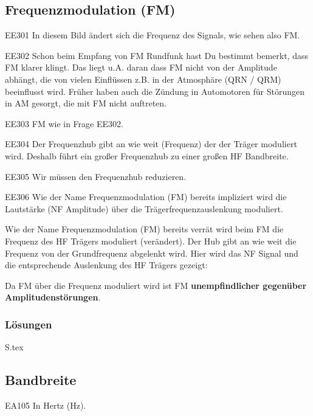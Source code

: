\documentclass[10pt,a4paper,ngerman]{article}
\theoremstyle{definition}
\theoremstyle{plain}
\theoremstyle{mytheorem}
\theoremstyle{definition}
\newcommand{\pic}[2][1]{%
\begin{center}
    \begin{tikzpicture}[scale=#1]
                
    \end{tikzpicture}
\end{center}    
}
\newenvironment{ohmchapter}{}
{
  \subsubsection*{Lösungen}
  S\arabic{subsection}.tex}
}
\begin{document}
\subsection{Frequenzmodulation (FM)}
\begin{sol}{EE301}
  In diesem Bild ändert sich die Frequenz des Signals, wie sehen also FM.
\end{sol}

\begin{sol}{EE302}
  Schon beim Empfang von FM Rundfunk hast Du bestimmt bemerkt, dass FM klarer klingt. Das liegt u.A. daran dass FM nicht von der Amplitude abhängt, die von vielen Einflüssen z.B. in der Atmosphäre (QRN / QRM) beeinflusst wird.
  Früher haben auch die Zündung in Automotoren für Störungen in AM gesorgt, die mit FM nicht auftreten.
\end{sol}

\begin{sol}{EE303}
  FM wie in Frage EE302.
\end{sol}

\begin{sol}{EE304}
  Der Frequenzhub gibt an wie weit (Frequenz) der der Träger moduliert wird. Deshalb führt ein großer Frequenzhub zu einer großen HF Bandbreite.
\end{sol}

\begin{sol}{EE305}
 Wir müssen den Frequenzhub reduzieren.
\end{sol}

\begin{sol}{EE306}
  Wie der Name Frequenzmodulation (FM) bereits impliziert wird die Lautstärke (NF Amplitude) über die Trägerfrequenzauslenkung moduliert.  
\end{sol}

\begin{ohmchapter}
  Wie der Name Frequenzmodulation (FM) bereits verrät wird beim FM die Frequenz des HF Trägers moduliert (verändert). Der Hub gibt an wie weit die Frequenz von der Grundfrequenz abgelenkt wird. Hier wird das NF Signal und die entsprechende Auslenkung des HF Trägers gezeigt:
  \pic[0.8]{fm}
  Da FM über die Frequenz moduliert wird ist FM \textbf{unempfindlicher gegenüber Amplitudenstörungen}. 
\end{ohmchapter}  

\subsection{Bandbreite}
\begin{sol}{EA105}
  In Hertz (Hz).
\end{sol}
\end{document}

